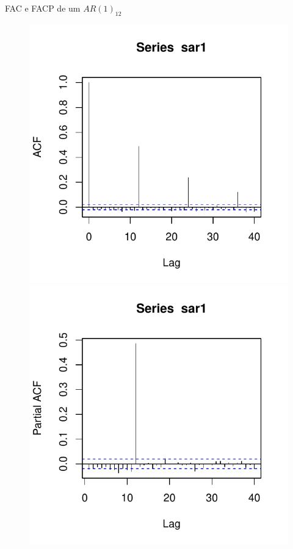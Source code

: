 \documentclass[11pt]{beamer}
\begin{document}
\begin{frame}{FAC e FACP de um $AR(1)_{12}$}
	
	\begin{figure}
		\includegraphics[scale=0.55]{graficos/fac_sar1.pdf} 		\includegraphics[scale=0.55]{graficos/facp_sar1.pdf}
	\end{figure}
\end{frame}
\end{document}
